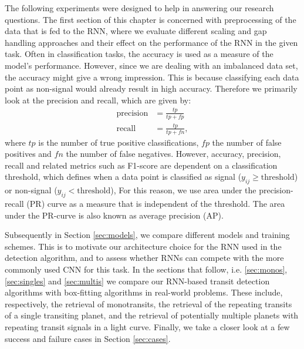 The following experiments were designed to help in answering our research questions. The first section of this chapter is concerned with preprocessing of the data that is fed to the RNN, where we evaluate different scaling and gap handling approaches and their effect on the performance of the RNN in the given task. Often in classification tasks, the accuracy is used as a measure of the model's performance. However, since we are dealing with an imbalanced data set, the accuracy might give a wrong impression. This is because classifying each data point as non-signal would already result in high accuracy. Therefore we primarily look at the precision and recall, which are given by:
\begin{align}
    \text{precision} &= \frac{tp}{tp + fp}\\
    \text{recall} &= \frac{tp}{tp + fn},
\end{align}
where $tp$ is the number of true positive classifications, $fp$ the number of false positives and $fn$ the number of false negatives.  However, accuracy, precision, recall and related metrics such as F1-score are dependent on a classification threshold, which defines when a data point is classified as signal ($y_{ij} \geq \text{threshold}$) or non-signal ($y_{ij} < \text{threshold}$), For this reason, we use area under the precision-recall (PR) curve as a measure that is independent of the threshold. The area under the PR-curve is also known as average precision (AP). 

Subsequently in Section \ref{sec:models}, we compare different models and training schemes. This is to motivate our architecture choice for the RNN used in the detection algorithm, and to assess whether RNNs can compete with the more commonly used CNN for this task. In the sections that follow, i.e. \ref{sec:monos}, \ref{sec:singles} and \ref{sec:multis} we compare our RNN-based transit detection algorithms with box-fitting algorithms in real-world problems. These include, respectively, the retrieval of monotransits, the retrieval of the repeating transits of a single transiting planet, and the retrieval of potentially multiple planets with repeating transit signals in a light curve. Finally, we take a closer look at a few success and failure cases in Section \ref{sec:cases}.
